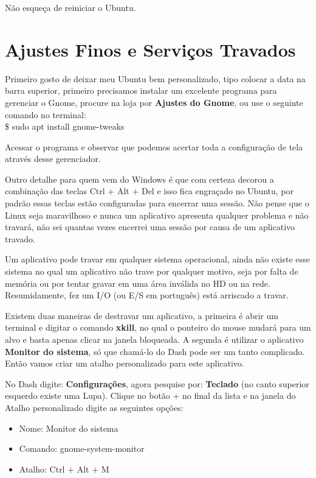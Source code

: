 Não esqueça de reiniciar o Ubuntu.

\section{Ajustes Finos e Serviços Travados}
Primeiro gosto de deixar meu Ubuntu bem personalizado, tipo colocar a data na barra superior, primeiro precisamos instalar um excelente programa para gerenciar o Gnome, procure na loja por \textbf{Ajustes do Gnome}, ou use o seguinte comando no terminal: \\
{\ttfamily\$ sudo apt install gnome-tweaks}

Acessar o programa e observar que podemos acertar toda a configuração de tela através desse gerenciador. 

Outro detalhe para quem vem do Windows é que com certeza decorou a combinação das teclas Ctrl + Alt + Del e isso fica engraçado no Ubuntu, por padrão essas teclas estão configuradas para encerrar uma sessão. Não pense que o Linux seja maravilhoso e nunca um aplicativo apresenta qualquer problema e não travará, não sei quantas vezes encerrei uma sessão por causa de um aplicativo travado. 

Um aplicativo pode travar em qualquer sistema operacional, ainda não existe esse sistema no qual um aplicativo não trave por qualquer motivo, seja por falta de memória ou por tentar gravar em uma área inválida no HD ou na rede. Resumidamente, fez um I/O (ou E/S em português) está arriscado a travar. 

Existem duas maneiras de destravar um aplicativo, a primeira é abrir um terminal e digitar o comando \textbf{xkill}, no qual o ponteiro do mouse mudará para um alvo e basta apenas clicar na janela bloqueada. A segunda é utilizar o aplicativo \textbf{Monitor do sistema}, só que chamá-lo do Dash pode ser um tanto complicado. Então vamos criar um atalho personalizado para este aplicativo.

No Dash digite: \textbf{Configurações}, agora pesquise por: \textbf{Teclado} (no canto superior esquerdo existe uma Lupa). Clique no botão + no final da lista e na janela do Atalho personalizado digite as seguintes opções: \vspace{-1em}
\begin{itemize}[noitemsep]
 \item Nome: Monitor do sistema
 \item Comando: gnome-system-monitor 
 \item Atalho: Ctrl + Alt + M
\end{itemize}

